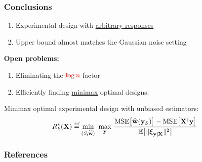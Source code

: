 \documentclass{beamer}
\begin{document}
\begin{frame}
  \frametitle{Conclusions}

  \begin{enumerate}
  \item Experimental design with \underline{arbitrary responses}
    \pause
  \item Upper bound almost matches the Gaussian noise setting
  \end{enumerate}  \pause
  \textbf{Open problems:}
  \begin{enumerate}
  \item Eliminating the ${\color{red} {\log n}}$ factor
  \item Efficiently finding \underline{minimax} optimal designs:
  \end{enumerate}
  \begin{definition}
    Minimax optimal experimental design with unbiased estimators:
\begin{align*}
R_k^*(\mathbf X)&\stackrel{\textit{\tiny{def}}}{=} 
  \min_{(S,\widehat{\mathbf w})}\ \max_{\mathbf y}\,\frac{\mathrm{MSE}\big[\widehat{\mathbf w}(\mathbf y_S)\big]-
     \mathrm{MSE}\big[\mathbf X^\dagger\mathbf y\big]
  }{\mathbb E\big[\|\boldsymbol\xi_{\mathbf y|\mathbf X}\|^2\big]}
\end{align*}
\end{definition}
\end{frame}

\begin{frame}
  \frametitle{References}
  \footnotesize


\end{frame}
\end{document}
